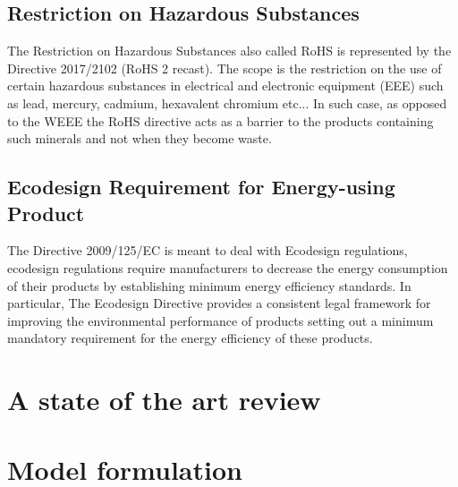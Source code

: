 \documentclass{article}
\begin{document}
\subsection{Restriction on Hazardous Substances}
The Restriction on Hazardous Substances also called RoHS is represented by the Directive 2017/2102 (RoHS 2 recast). The scope is the restriction on the use of certain hazardous substances in electrical and electronic equipment (EEE) such as lead, mercury, cadmium, hexavalent chromium etc... In such case, as opposed to the WEEE the RoHS directive acts as a barrier to the products containing such minerals and not when they become waste.

\subsection{Ecodesign Requirement for Energy-using Product}
The Directive 2009/125/EC is meant to deal with Ecodesign regulations, ecodesign regulations require manufacturers to decrease the energy consumption of their products by establishing minimum energy efficiency standards. In particular, The Ecodesign Directive provides a consistent legal framework for improving the environmental performance of products setting out a minimum mandatory requirement for the energy efficiency of these products.


\section{A state of the art review}

\section{Model formulation}
\end{document}
